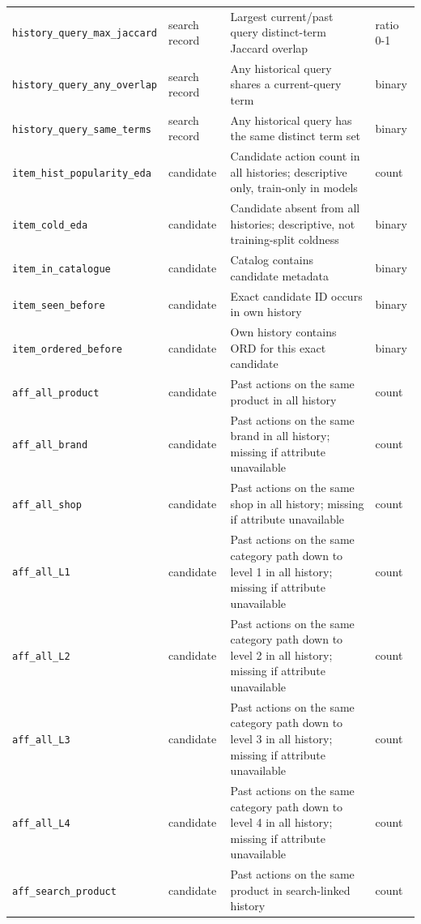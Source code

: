 \documentclass[11pt,a4paper]{article}
\begin{document}
{\begin{longtable}{>{\raggedright\arraybackslash}p{3.7cm} >{\raggedright\arraybackslash}p{2.3cm} >{\raggedright\arraybackslash}p{6.0cm} >{\raggedright\arraybackslash}p{2.6cm}}
\texttt{history\_query\_max\_jaccard} & search record & Largest current/past query distinct-term Jaccard overlap & ratio 0-1 \\
\texttt{history\_query\_any\_overlap} & search record & Any historical query shares a current-query term & binary \\
\texttt{history\_query\_same\_terms} & search record & Any historical query has the same distinct term set & binary \\
\texttt{item\_hist\_popularity\_eda} & candidate & Candidate action count in all histories; descriptive only, train-only in models & count \\
\texttt{item\_cold\_eda} & candidate & Candidate absent from all histories; descriptive, not training-split coldness & binary \\
\texttt{item\_in\_catalogue} & candidate & Catalog contains candidate metadata & binary \\
\texttt{item\_seen\_before} & candidate & Exact candidate ID occurs in own history & binary \\
\texttt{item\_ordered\_before} & candidate & Own history contains ORD for this exact candidate & binary \\
\texttt{aff\_all\_product} & candidate & Past actions on the same product in all history & count \\
\texttt{aff\_all\_brand} & candidate & Past actions on the same brand in all history; missing if attribute unavailable & count \\
\texttt{aff\_all\_shop} & candidate & Past actions on the same shop in all history; missing if attribute unavailable & count \\
\texttt{aff\_all\_L1} & candidate & Past actions on the same category path down to level 1 in all history; missing if attribute unavailable & count \\
\texttt{aff\_all\_L2} & candidate & Past actions on the same category path down to level 2 in all history; missing if attribute unavailable & count \\
\texttt{aff\_all\_L3} & candidate & Past actions on the same category path down to level 3 in all history; missing if attribute unavailable & count \\
\texttt{aff\_all\_L4} & candidate & Past actions on the same category path down to level 4 in all history; missing if attribute unavailable & count \\
\texttt{aff\_search\_product} & candidate & Past actions on the same product in search-linked history & count \\

\end{longtable}}
\end{document}
